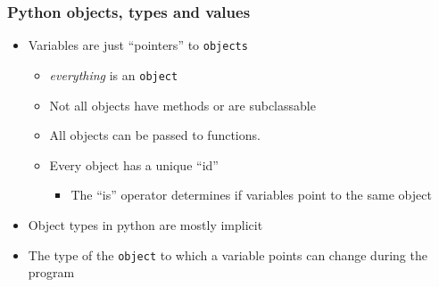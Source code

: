 \documentclass[xcolor=table,10pt,final]{beamer}
\begin{document}
\begin{frame}[fragile]
  \frametitle{Python objects, types and values}
  \begin{itemize}
    \item Variables are just ``pointers'' to {\tt objects}
      \begin{itemize}
        \item {\it everything} is an {\tt object}
        \item Not all objects have methods or are subclassable
        \item All objects can be passed to functions.
        \item Every object has a unique ``id''
          \begin{itemize}
            \item The ``is'' operator determines if variables point to the same object
          \end{itemize}
      \end{itemize}
    \item Object types in python are mostly implicit
    \item The type of the {\tt object} to which a variable points can change during the program
  \end{itemize}
\end{frame}
\end{document}
